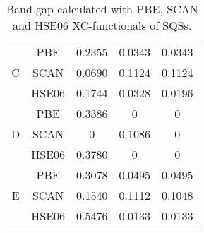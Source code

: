 \begin{table}[H]
\begin{tabular}{@{}ccccc@{}}
\multicolumn{1}{c|}{\multirow{3}{*}{C}} & PBE           & 0.2355                                                           & 0.0343                                                           & 0.0343                                                            \\
\multicolumn{1}{c|}{}                   & SCAN          & 0.0690                                                           & 0.1124                                                           & 0.1124                                                            \\
\multicolumn{1}{c|}{}                   & HSE06         & 0.1744                                                           & 0.0328                                                           & 0.0196                                                            \\ \midrule
\multicolumn{1}{c|}{\multirow{3}{*}{D}} & PBE           & 0.3386                                                           & 0                                                                & 0                                                                 \\
\multicolumn{1}{c|}{}                   & SCAN          & 0                                                                & 0.1086                                                           & 0                                                                 \\
\multicolumn{1}{c|}{}                   & HSE06         & 0.3780                                                           & 0                                                                & 0                                                                 \\ \midrule
\multicolumn{1}{c|}{\multirow{3}{*}{E}} & PBE           & 0.3078                                                           & 0.0495                                                           & 0.0495                                                            \\
\multicolumn{1}{c|}{}                   & SCAN          & 0.1540                                                           & 0.1112                                                           & 0.1048                                                            \\
\multicolumn{1}{c|}{}                   & HSE06         & 0.5476                                                           & 0.0133                                                           & 0.0133                                                            \\ \bottomrule
\end{tabular}
\caption{Band gap calculated with PBE, SCAN and HSE06 XC-functionals of  SQSs.}
\end{table}

